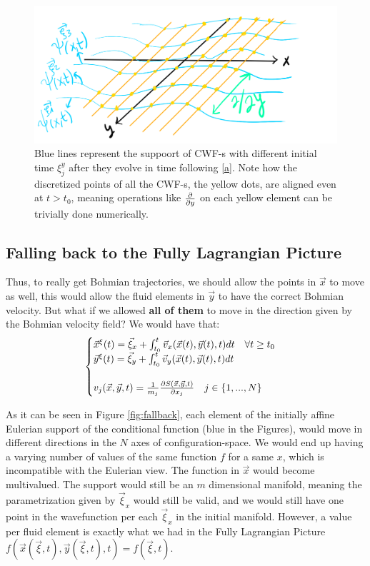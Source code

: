 \documentclass[11pt, a4paper]{article} %
\DeclareRobustCommand{\mybox}[2][gray!10]{%
\begin{tcolorbox}[   %
        left=0.2cm,
        right=0.2cm,
        top=0.15cm,
        bottom=0.15cm,
        colback=#1,
        colframe=#1,
        width=\dimexpr\textwidth\relax, 
        enlarge left by=0mm,
        boxsep=5pt,
        arc=0pt,outer arc=0pt,
        ]
        #2
\end{tcolorbox}
}
\begin{document}
\begin{figure}[h!]
  \centering
    \includegraphics[width=0.65\linewidth]{aligned.png}
  \caption{Blue lines represent the suppoort of CWF-s with different initial time $\xi^y_j$ after they evolve in time following  \eqref{a}. Note how the discretized points of all the CWF-s, the yellow dots, are aligned even at $t>t_0$, meaning operations like $\pdv{}{y}$ on each yellow element can be trivially done numerically. }
  \label{fig:only_y_grid}
\end{figure}
\mybox{
\subsection*{Falling back to the Fully Lagrangian Picture}
Thus, to really get Bohmian trajectories, we should allow the points in $\vec{x}$ to move as well, this would allow the fluid elements in $\vec{y}$ to have the correct Bohmian velocity. But what if we allowed {\bf all of them} to move in the direction given by the Bohmian velocity field? We would have that:
\begin{equation}
\begin{cases}\label{b}
\vec{x}^\xi(t)=\vec{\xi}_x +\int_{t_0}^t \vec{v}_x(\vec{x}(t), \vec{y}(t),t)dt\quad \forall t\geq t_0\\
\vec{y}^\xi(t)=\vec{\xi}_y+\int_{t_0}^t \vec{v}_y(\vec{x}(t), \vec{y}(t),t)dt\\ \\
v_j(\vec{x}, \vec{y},t)=\frac{1}{m_j}\pdv{S(\vec{x}, \vec{y},t)}{x_j}\quad j\in\{1,...,N \}
\end{cases}
\end{equation}

As it can be seen in Figure \ref{fig:fallback}, each element of the initially affine Eulerian support of the conditional function (blue in the Figures), would move in different directions in the $N$ axes of configuration-space. We would end up having a varying number of values of the same function $f$ for a same $x$, which is incompatible with the Eulerian view. The function in $\vec{x}$ would become multivalued. The support would still be an $m$ dimensional manifold, meaning the parametrization given by $\vec{\xi}_x$ would still be valid, and we would still have one point in the wavefunction per each $\vec{\xi}_x$ in the initial manifold. However, a value per fluid element is exactly what we had in the Fully Lagrangian Picture $f(\vec{x}(\vec{\xi},t), \vec{y}(\vec{\xi},t),t)=f(\vec{\xi},t)$.
}
\end{document}
